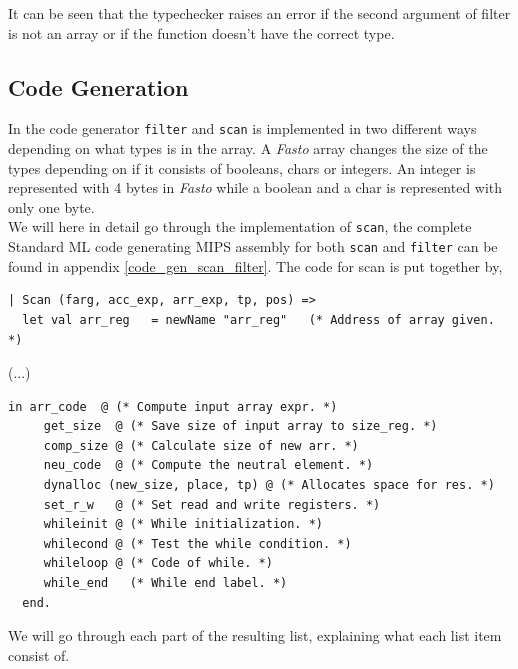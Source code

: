 \documentclass[11pt]{article}
\begin{document}
    It can be seen that the typechecker raises an error if the second argument
    of filter is not an array or if the function doesn't have the correct type.

    \subsection{Code Generation}
    In the code generator \texttt{filter} and \texttt{scan} is implemented in
    two different ways depending on what types is in the array.  A
    \textit{Fasto} array changes the size of the types depending on if it
    consists of booleans, chars or integers.  An integer is represented with 4
    bytes in \textit{Fasto} while a boolean and a char is represented with only
    one byte. \\

    We will here in detail go through the implementation of \texttt{scan}, the
    complete Standard ML code generating MIPS assembly for both \texttt{scan}
    and \texttt{filter} can be found in appendix \ref{code_gen_scan_filter}.
    The code for scan is put together by,

    \begin{lstlisting}[firstnumber=710]
| Scan (farg, acc_exp, arr_exp, tp, pos) =>
  let val arr_reg   = newName "arr_reg"   (* Address of array given. *)
\end{lstlisting}
      (...)
 \begin{lstlisting}[firstnumber=766]
  in arr_code  @ (* Compute input array expr. *)
     get_size  @ (* Save size of input array to size_reg. *)
     comp_size @ (* Calculate size of new arr. *)
     neu_code  @ (* Compute the neutral element. *)
     dynalloc (new_size, place, tp) @ (* Allocates space for res. *)
     set_r_w   @ (* Set read and write registers. *)
     whileinit @ (* While initialization. *)
     whilecond @ (* Test the while condition. *)
     whileloop @ (* Code of while. *)
     while_end   (* While end label. *)
  end.
    \end{lstlisting}

    We will go through each part of the resulting list, explaining what each
    list item consist of.
\end{document}
